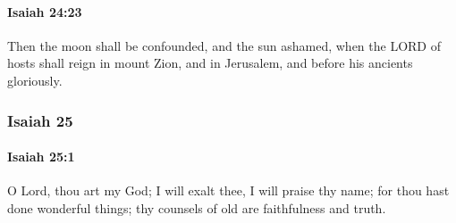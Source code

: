 		\paragraph{Isaiah 24:23} %
			\label{ISAIAH-24-23}

			Then the moon shall be confounded, and the sun ashamed, when the LORD of hosts shall reign in mount Zion, and in Jerusalem, and before his ancients gloriously.

	\subsubsection{Isaiah 25} %
		\label{ISAIAH-25}

		\paragraph{Isaiah 25:1} %
			\label{ISAIAH-25-1}

			O Lord, thou art my God; I will exalt thee, I will praise thy name; for thou hast done wonderful things; thy counsels of old are faithfulness and truth.

